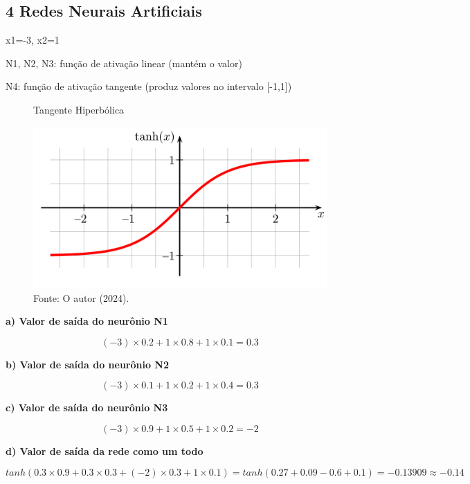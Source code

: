 
\subsection*{\textbf{4 Redes Neurais Artificiais}}

x1=-3, x2=1

N1, N2, N3: função de ativação linear (mantém o valor)

N4: função de ativação tangente (produz valores no intervalo [-1,1])

\begin{figure}[!h]
\centering
\caption{Tangente Hiperbólica}
\includegraphics[width=0.6\linewidth]{apendices/fig/1_IAA001_5.png}
\caption*{Fonte: O autor (2024).}
\label{tanh}
\end{figure}


\begin{adjustwidth}{1em}{}
\textbf{a) Valor de saída do neurônio N1}
\end{adjustwidth}
\begin{equation*}
    (-3)\times0.2 + 1\times0.8 + 1\times0.1 = 0.3
\end{equation*}

\begin{adjustwidth}{1em}{}
\textbf{b) Valor de saída do neurônio N2}
\end{adjustwidth}
\begin{equation*}
    (-3)\times0.1 + 1\times0.2 + 1\times0.4 = 0.3
\end{equation*}

\begin{adjustwidth}{1em}{}
\textbf{c) Valor de saída do neurônio N3}
\end{adjustwidth}
\begin{equation*}
    (-3)\times0.9 + 1\times0.5 + 1\times0.2 = -2
\end{equation*}

\begin{adjustwidth}{1em}{}
\textbf{d) Valor de saída da rede como um todo}
\end{adjustwidth}
\begin{equation*}
    tanh(0.3\times0.9 + 0.3\times0.3 + (-2)\times0.3 + 1\times0.1) = tanh(0.27 + 0.09 - 0.6 + 0.1) = -0.13909 \approx -0.14
\end{equation*}